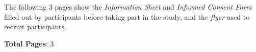 The following 3 pages show the \emph{Information Sheet} and \emph{Informed Consent Form} filled out by participants before taking part in the study, and the \emph{flyer} used to recruit participants. 

\textbf{Total Pages}: 3




